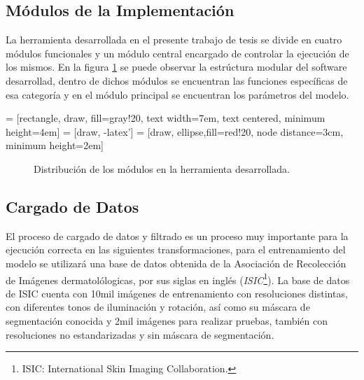 \subsection{Módulos de la Implementación}
La herramienta desarrollada en el presente trabajo de tesis se divide en cuatro módulos funcionales y un módulo central encargado de controlar la ejecución de los mismos. En la figura \ref{fig: modules} se puede observar la estrúctura modular del software desarrollad, dentro de dichos módulos se encuentran las funciones específicas de esa categoría y en el módulo principal se encuentran los parámetros del modelo.

 = [rectangle, draw, fill=gray!20, 
    text width=7em, text centered, minimum height=4em]
 = [draw, -latex']
 = [draw, ellipse,fill=red!20, node distance=3cm,
    minimum height=2em]

\begin{figure}[H]
    \centering
    \caption{Distribución de los módulos en la herramienta desarrollada.}
    \label{fig: modules}
\end{figure}

\subsection{Cargado de Datos}
El proceso de cargado de datos y filtrado es un proceso muy importante para la ejecución correcta en las siguientes transformaciones, para el entrenamiento del modelo se utilizará una base de datos obtenida de la Asociación de Recolección de Imágenes dermatolólogicas, por sus siglas en inglés (\emph{ISIC}\footnote{ISIC: International Skin Imaging Collaboration.}). La base de datos de ISIC cuenta con 10mil imágenes de entrenamiento con resoluciones distintas, con diferentes tonos de iluminación y rotación, así como su máscara de segmentación conocida y 2mil imágenes para realizar pruebas, también con resoluciones no estandarizadas y sin máscara de segmentación.

